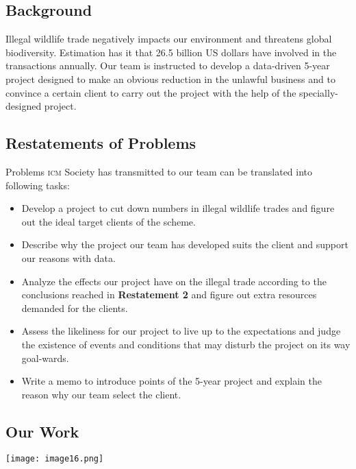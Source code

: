 \documentclass[12pt]{article}
\begin{document}
\subsection{Background}
Illegal wildlife trade negatively impacts our environment and threatens global biodiversity. Estimation has it that 26.5 billion US dollars have involved in the transactions annually. Our team is instructed to develop a data-driven 5-year project designed to make an obvious reduction in the unlawful business and to convince a certain client to carry out the project with the help of the specially-designed project.
\subsection{Restatements of Problems}
Problems \textsc{icm} Society has transmitted to our team can be translated into following tasks:
\begin{itemize}
	\item Develop a project to cut down numbers in illegal wildlife trades and figure out the ideal target clients of the scheme.
	\item Describe why the project our team has developed suits the client and support our reasons with data.
	\item Analyze the effects our project have on the illegal trade according to the conclusions reached in \textbf{Restatement 2} and figure out extra resources demanded for the clients.
	\item Assess the likeliness for our project to live up to the expectations and judge the existence of events and conditions that may disturb the project on its way goal-wards.
	\item Write a memo to introduce points of the 5-year project and explain the reason why our team select the client.
\end{itemize}
\subsection{Our Work}
\begin{figure*}[htbp]
\centering
\texttt{[image: image16.png]}
\end{figure*}

\clearpage
\end{document}
